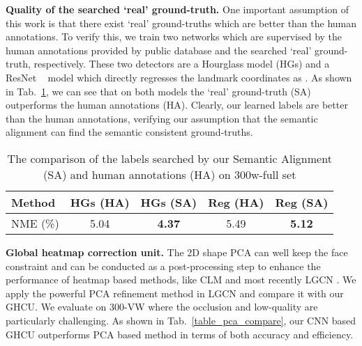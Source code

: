 \documentclass[10pt,twocolumn,letterpaper]{article}
\begin{document}
{{		
		
\textbf{Quality of the searched `real' ground-truth.}
		{One important assumption of this work is that there exist `real' ground-truths which are better than the human annotations. To verify this, we train two networks which are supervised by the human annotations 
			provided by public database and the searched `real' ground-truth, respectively. These two detectors are a 
			Hourglass model (HGs) and a ResNet ~\cite{he2016deep} model which directly regresses the landmark 
			coordinates as \cite{feng2017wing}. As shown in Tab.~\ref{table_label_qa}, we can see that on both models the `real' ground-truth (SA) outperforms 
			the human annotations (HA). Clearly, our learned labels are better than the human annotations, verifying our assumption that the semantic alignment can find the semantic consistent ground-truths. 
		}
		
		
		


		
		\begin{table}[!thp]
			\centering
			\caption{
The comparison of the labels searched by our Semantic Alignment (SA) and human annotations (HA)  on 300w-full set
			}
			\vspace{3pt}
			\footnotesize
			\label{table_label_qa}
			\begin{tabular}{l|cccc}
				\hline
				Method   & HGs (HA) & \textbf{HGs (SA) } & Reg (HA) & \textbf{Reg (SA)} \\
				\hline
				NME (\%) & 5.04 & \textbf{4.37} & 5.49 & \textbf{5.12} \\
				\hline
			\end{tabular}
		\end{table}
		


		
		
		\textbf{Global heatmap correction unit.} 
		The 2D shape PCA can well keep the face constraint and can be conducted as 
		a post-processing step to enhance the performance of heatmap based methods, like CLM \cite{cristinacce2008automatic} and 
		most recently LGCN \cite{merget2018robust}. We apply the powerful PCA refinement method in LGCN and compare it with our 
		GHCU. We evaluate on 300-VW where the occlusion and low-quality are particularly challenging. 
		As shown in Tab.~\ref{table_pca_compare}, our CNN based GHCU outperforms PCA based method in terms of both accuracy and efficiency. 
		
}}
\end{document}
